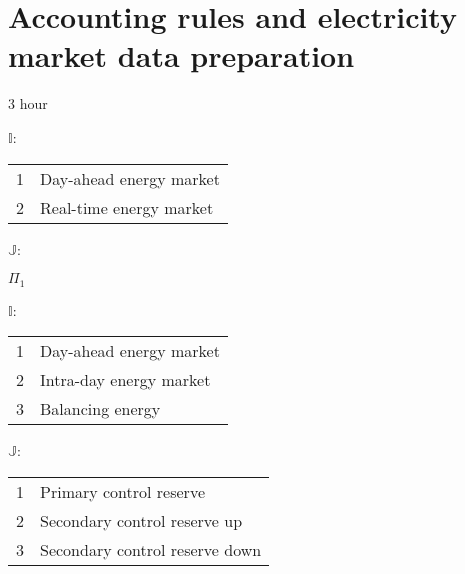 
\chapter{Accounting rules and electricity market data preparation}
\label{sec:accounting-data-prepare}
3 hour

$\mathbb{I}$:
\begin{table}
	\begin{tabular}{ll}
		1 & Day-ahead energy market\\
		2 & Real-time energy market
	\end{tabular}
\end{table}

$\mathbb{J}$:


$\Pi_1$


$\mathbb{I}$:
\begin{table}
	\begin{tabular}{ll}
		1 & Day-ahead energy market\\
		2 & Intra-day energy market\\
		3 & Balancing energy\\
	\end{tabular}
\end{table}



$\mathbb{J}$:
\begin{table}
	\begin{tabular}{ll}
		1 & Primary control reserve\\
		2 & Secondary control reserve up\\
		3 & Secondary control reserve down\\
	\end{tabular}
\end{table}



